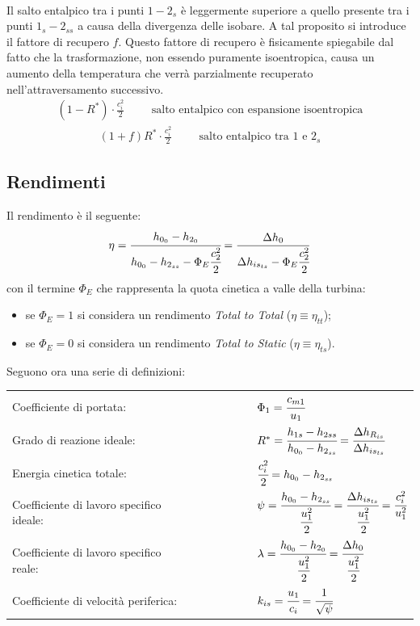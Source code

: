 \\Il salto entalpico tra i punti $1 - 2_s$ è leggermente superiore a quello presente tra i punti $1_s - 2_{ss}$ a causa della divergenza delle isobare. A tal proposito si introduce il fattore di recupero $f$. Questo fattore di recupero è fisicamente spiegabile dal fatto che la trasformazione, non essendo puramente isoentropica, causa un aumento della temperatura che verrà parzialmente recuperato nell'attraversamento successivo. 
\begin{align*}
(1- R^*) \cdot \frac{c_i^2}{2} \hspace{1cm} \mbox{salto entalpico con espansione isoentropica}
\end{align*}
\begin{align*}
(1+f)R^* \cdot \frac{c_i^2}{2} \hspace{1cm} \mbox{salto entalpico tra $1$ e $2_s$}
\end{align*}


\subsection{Rendimenti}
Il rendimento è il seguente:
\begin{align*}
\eta = \cfrac{h_{0_0} - h_{2_0}}{h_{0_0} - h_{2_{ss}} - \Phi_E \cfrac{c_2^2}{2}} = \frac{\Delta h_0}{\Delta h_{is_{ts}}-\Phi_E \cfrac{c_2^2}{2}}
\end{align*}
con il termine $\Phi_E$ che rappresenta la quota cinetica a valle della turbina:
\begin{itemize}
	\item se $\Phi_E=1$ si considera un rendimento \textit{Total to Total} ($\eta \equiv \eta_{tt}$);
	\item se $\Phi_E=0$ si considera un rendimento \textit{Total to Static} ($\eta \equiv \eta_{ts}$).
\end{itemize}
Seguono ora una serie di definizioni:\\
\renewcommand\arraystretch{3}
\begin{tabular}{l l l l l l l}
	Coefficiente di portata: & & & & & & $\Phi_1 = \cfrac{c_{m1}}{u_1}$\\
	Grado di reazione ideale: & & & & & & $R^* = \cfrac{h_{1s} - h_{2ss}}{h_{0_0} - h_{2_{ss}}} = \cfrac{\Delta h_{R_{is}}}{\Delta h_{is_{ts}}}$\\
	Energia cinetica totale: & & & & & & $\cfrac{c_i^2}{2}=h_{0_0} - h_{2_{ss}}$\\
	Coefficiente di lavoro specifico ideale: & & & & & &  $\psi = \cfrac{h_{0_0} - h_{2_{ss}}}{\cfrac{u_1^2}{2}} = \cfrac{\Delta h_{is_{ts}}}{\cfrac{u_1^2}{2}}= \cfrac{c_i^2}{u_1^2}$\\
	Coefficiente di lavoro specifico reale: & & & & & & $\lambda = \cfrac{h_{0_0} - h_{2_0}}{\cfrac{u_1^2}{2}}= \cfrac{\Delta h_0}{\cfrac{u_1^2}{2}}$\\
	Coefficiente di velocità periferica: & & & & & & $k_{is} = \cfrac{u_1}{c_i} = \cfrac{1}{\sqrt{\psi}}$\\
\end{tabular}

